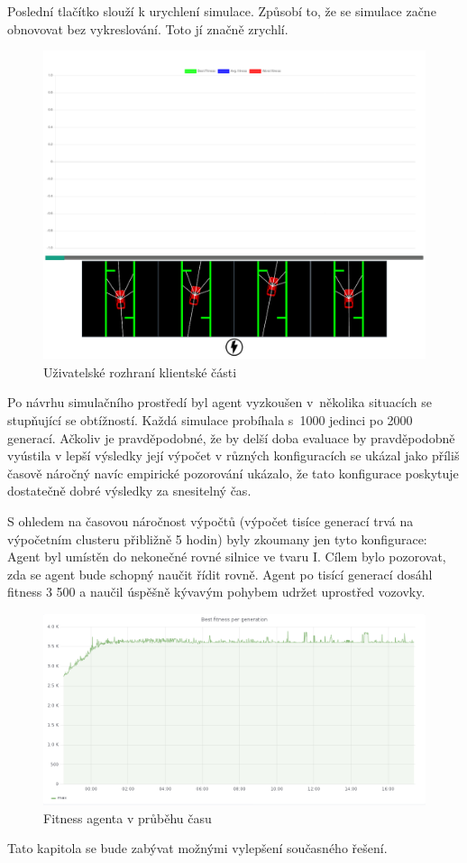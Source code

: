 Poslední tlačítko slouží k urychlení simulace. Způsobí to, že se simulace začne obnovovat bez vykreslování. Toto jí značně zrychlí.

\begin{figure}[h!]
	\centering
	\includegraphics[width=0.6\linewidth]{visualization}
	\caption{Uživatelské rozhraní klientské části}
	\label{fig:visualization}
\end{figure}


Po návrhu simulačního prostředí byl agent vyzkoušen v~několika situacích se stupňující se obtížností. Každá simulace probíhala s~1000 jedinci po 2000 generací. Ačkoliv je pravděpodobné, že by delší doba evaluace by pravděpodobně vyústila v lepší výsledky její výpočet v různých konfiguracích se ukázal jako příliš časově náročný navíc empirické pozorování ukázalo, že tato konfigurace poskytuje dostatečně dobré výsledky za snesitelný čas. 

S ohledem na časovou náročnost výpočtů (výpočet tisíce generací trvá na výpočetním clusteru přibližně 5 hodin) byly zkoumany jen tyto konfigurace:
Agent byl umístěn do nekonečné rovné silnice ve tvaru I. Cílem bylo pozorovat, zda se agent bude schopný naučit řídit rovně. Agent po tisící generací dosáhl fitness 3 500 a naučil úspěšně kývavým pohybem udržet uprostřed vozovky.
\begin{figure}[h]
	\centering
	\includegraphics[scale=0.4]{I_fitness}
	\caption{Fitness agenta v průběhu času}
	\label{fig:i-experiment}
\end{figure}

Tato kapitola se bude zabývat možnými vylepšení současného řešení.


